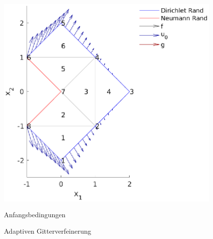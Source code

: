 \documentclass{scrartcl}
\begin{document}
\begin{figure}[h]
\centering
\begin{minipage}[b]{0.45\textwidth}
\centering
\includegraphics[width=1.3\textwidth]{Plots/LShapeBenchmarkInitial4}
\caption{Anfangsbedingungen}
\label{pl:LShapeBenchmarkInitial}
\end{minipage}
\hfill
\begin{minipage}[b]{0.45\textwidth}
\centering
\scalebox{0.7}{

}
\caption{Adaptiven Gitterverfeinerung}
\label{fc:AdaptiveAlgFlowchart}
\end{minipage}
\end{figure}
\end{document}
